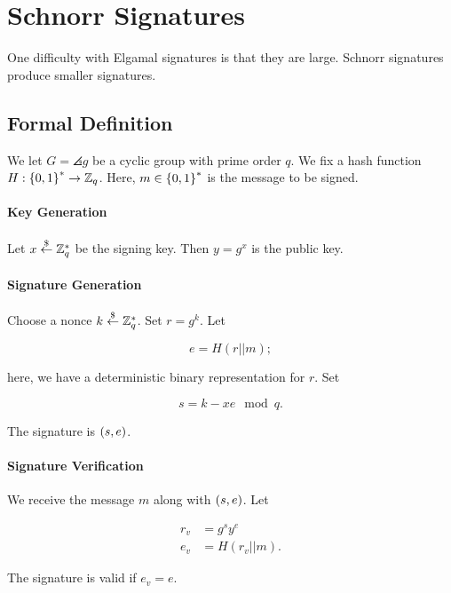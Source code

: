 \section{Schnorr Signatures}
\label{sec:signatures_schnorr}

One difficulty with Elgamal signatures is that they are large.
Schnorr signatures produce smaller signatures.

\subsection{Formal Definition}

\begin{defn}
We let $G = \angles{g}$ be a \gls{cyclic group} with prime order $q$.
We fix a \gls{hash function} $H:\left\{ 0,1 \right\}^{*}\to\mathbb{Z}_{q}$.
Here, $m\in\left\{ 0,1 \right\}^{*}$ is the message to be signed.

\paragraph{Key Generation}
Let $x\stackrel{\$}{\leftarrow}{}\mathbb{Z}_{q}^{*}$ be the signing key.
Then $y = g^{x}$ is the public key.

\paragraph{Signature Generation}
Choose a \gls{nonce} $k\stackrel{\$}{\leftarrow}{}\mathbb{Z}_{q}^{*}$.
Set $r = g^{k}$.
Let

\begin{equation}
    e = H(r||m);
\end{equation}

\noindent
here, we have a deterministic binary representation for $r$.
Set

\begin{equation}
    s = k - xe \mod q.
\end{equation}

\noindent
The signature is $\left( s,e \right)$.

\paragraph{Signature Verification}
We receive the message $m$ along with $\left( s,e \right)$.
Let

\begin{align}
    r_{v} &= g^{s}y^{e}
        \nonumber\\
    e_{v} &= H(r_{v}||m).
\end{align}

\noindent
The signature is valid if $e_{v} = e$.
\end{defn}

